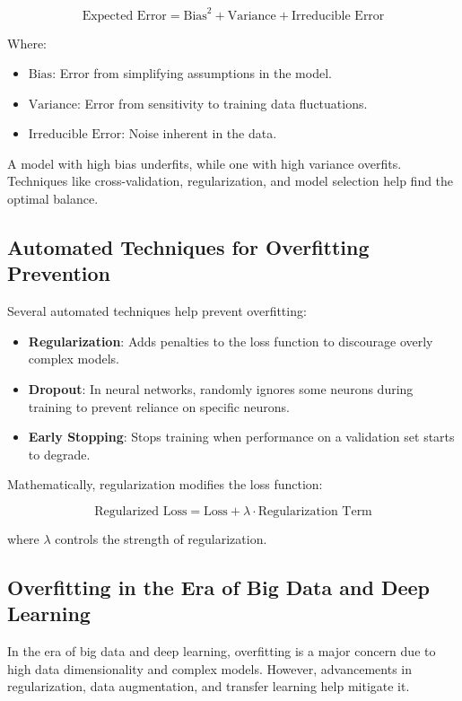 \documentclass[12pt]{book} %
\begin{document}
\[
\text{Expected Error} = \text{Bias}^2 + \text{Variance} + \text{Irreducible Error}
\]

Where:
\begin{itemize}
    \item $\text{Bias}$: Error from simplifying assumptions in the model.
    \item $\text{Variance}$: Error from sensitivity to training data fluctuations.
    \item $\text{Irreducible Error}$: Noise inherent in the data.
\end{itemize}

A model with high bias underfits, while one with high variance overfits. Techniques like cross-validation, regularization, and model selection help find the optimal balance.

\subsection{Automated Techniques for Overfitting Prevention}

Several automated techniques help prevent overfitting:

\begin{itemize}
    \item \textbf{Regularization}: Adds penalties to the loss function to discourage overly complex models.
    \item \textbf{Dropout}: In neural networks, randomly ignores some neurons during training to prevent reliance on specific neurons.
    \item \textbf{Early Stopping}: Stops training when performance on a validation set starts to degrade.
\end{itemize}

Mathematically, regularization modifies the loss function:

\[
\text{Regularized Loss} = \text{Loss} + \lambda \cdot \text{Regularization Term}
\]

where $\lambda$ controls the strength of regularization.

\subsection{Overfitting in the Era of Big Data and Deep Learning}

In the era of big data and deep learning, overfitting is a major concern due to high data dimensionality and complex models. However, advancements in regularization, data augmentation, and transfer learning help mitigate it.
\end{document}
